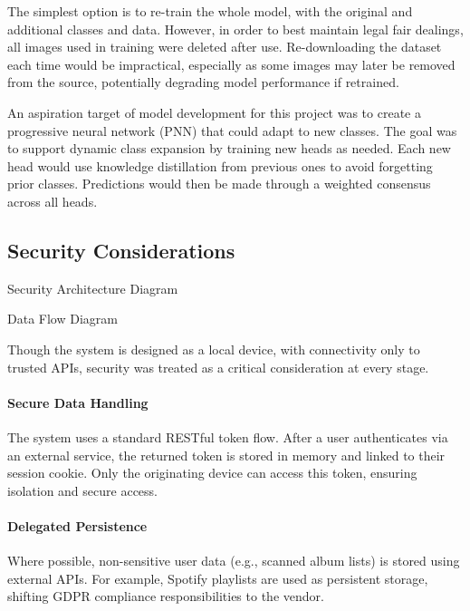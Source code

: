                 The simplest option is to re-train the whole model, with the original and additional classes and data. However, in order to best maintain legal fair dealings, all images used in training were deleted after use. Re-downloading the dataset each time would be impractical, especially as some images may later be removed from the source, potentially degrading model performance if retrained.
    
                An aspiration target of model development for this project was to create a progressive neural network (PNN) that could adapt to new classes. The goal was to support dynamic class expansion by training new heads as needed. Each new head would use knowledge distillation from previous ones to avoid forgetting prior classes. Predictions would then be made through a weighted consensus across all heads.
    
        \subsection{Security Considerations} \label{sec:security}
    
            \begin{temp}
                Security Architecture Diagram
            \end{temp}
    
            \begin{temp}
                Data Flow Diagram
            \end{temp}
    
            
            Though the system is designed as a local device, with connectivity only to trusted APIs, security was treated as a critical consideration at every stage.
    
            \paragraph{Secure Data Handling} The system uses a standard RESTful token flow. After a user authenticates via an external service, the returned token is stored in memory and linked to their session cookie. Only the originating device can access this token, ensuring isolation and secure access.
    
            \paragraph{Delegated Persistence} Where possible, non-sensitive user data (e.g., scanned album lists) is stored using external APIs. For example, Spotify playlists are used as persistent storage, shifting GDPR compliance responsibilities to the vendor.
    
